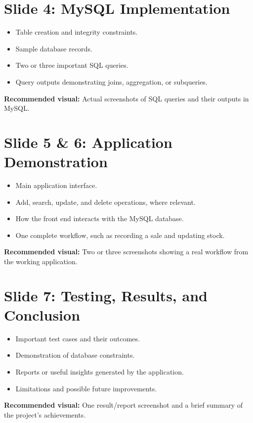 \documentclass[12pt,a4paper]{article}
\begin{document}
\section*{Slide 4: MySQL Implementation}
\begin{itemize}
    \item Table creation and integrity constraints.
    \item Sample database records.
    \item Two or three important SQL queries.
    \item Query outputs demonstrating joins, aggregation, or subqueries.
\end{itemize}
\textbf{Recommended visual:} Actual screenshots of SQL queries and their outputs in MySQL.

\section*{Slide 5 \& 6: Application Demonstration}
\begin{itemize}
    \item Main application interface.
    \item Add, search, update, and delete operations, where relevant.
    \item How the front end interacts with the MySQL database.
    \item One complete workflow, such as recording a sale and updating stock.
\end{itemize}
\textbf{Recommended visual:} Two or three screenshots showing a real workflow from the working application.

\section*{Slide 7: Testing, Results, and Conclusion}
\begin{itemize}
    \item Important test cases and their outcomes.
    \item Demonstration of database constraints.
    \item Reports or useful insights generated by the application.
    \item Limitations and possible future improvements.
\end{itemize}
\textbf{Recommended visual:} One result/report screenshot and a brief summary of the project's achievements.
\end{document}
